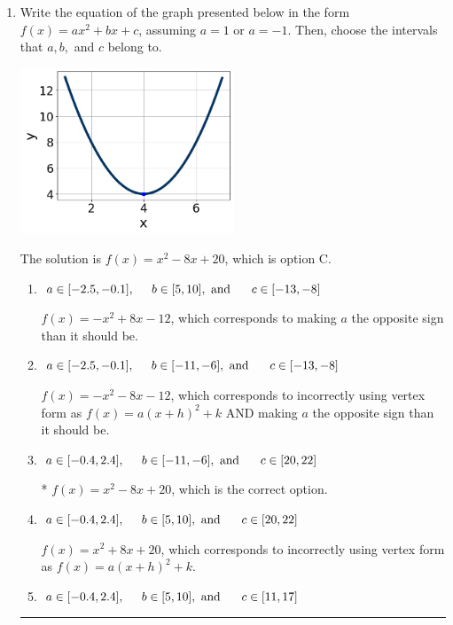 \documentclass{extbook}[14pt]
\newcommand{\litem}[1]{\item #1

\rule{\textwidth}{0.4pt}}
\begin{document}
\begin{enumerate}\litem{
Write the equation of the graph presented below in the form $f(x)=ax^2+bx+c$, assuming  $a=1$ or $a=-1$. Then, choose the intervals that $a, b,$ and $c$ belong to.

\begin{center}
    \includegraphics[width=0.5\textwidth]{../Figures/quadraticGraphToEquationB.png}
\end{center}


The solution is \( f(x) = x^{2} -8 x + 20 \), which is option C.\begin{enumerate}[label=\Alph*.]
\item \( a \in [-2.5, -0.1], \hspace*{5mm} b \in [5, 10], \text{ and } \hspace*{5mm} c \in [-13, -8] \)

$f(x)=-x^{2} +8 x -12$, which corresponds to making $a$ the opposite sign than it should be.
\item \( a \in [-2.5, -0.1], \hspace*{5mm} b \in [-11, -6], \text{ and } \hspace*{5mm} c \in [-13, -8] \)

$f(x)=-x^{2} -8 x -12$, which corresponds to incorrectly using vertex form as $f(x) = a(x+h)^2+k$ AND making $a$ the opposite sign than it should be.
\item \( a \in [-0.4, 2.4], \hspace*{5mm} b \in [-11, -6], \text{ and } \hspace*{5mm} c \in [20, 22] \)

* $f(x)=x^{2} -8 x + 20$, which is the correct option.
\item \( a \in [-0.4, 2.4], \hspace*{5mm} b \in [5, 10], \text{ and } \hspace*{5mm} c \in [20, 22] \)

$f(x)=x^{2} +8 x + 20$, which corresponds to incorrectly using vertex form as $f(x) = a(x+h)^2+k$.
\item \( a \in [-0.4, 2.4], \hspace*{5mm} b \in [5, 10], \text{ and } \hspace*{5mm} c \in [11, 17] \)


\end{enumerate}}
\end{enumerate}
\end{document}

